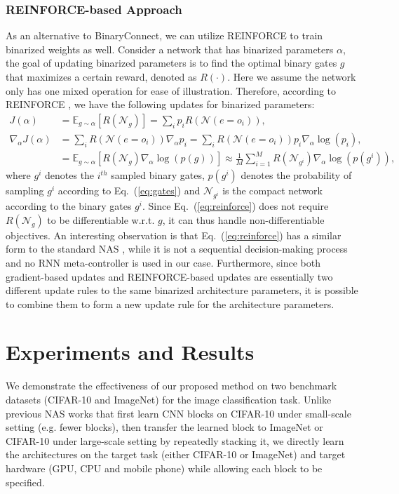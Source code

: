 \documentclass{article} \usepackage{iclr2019_conference,times}
\begin{document}
\subsubsection{REINFORCE-based Approach}\label{sec:reinforce_algo}
As an alternative to BinaryConnect, we can utilize REINFORCE to train binarized weights as well. Consider a network that has binarized parameters $\alpha$, the goal of updating binarized parameters is to find the optimal binary gates $g$ that maximizes a certain reward, denoted as $R(\cdot)$. Here we assume the network only has one mixed operation for ease of illustration. Therefore, according to REINFORCE \citep{williams1992simple}, we have the following updates for binarized parameters:
\begin{align}
\label{eq:reinforce}
    J(\alpha) &= \mathbb{E}_{g \sim \alpha}[R(\mathcal{N}_g)] 
               = \sum_i p_i R(\mathcal{N}(e = o_i)), \nonumber \\
    \nabla_\alpha J(\alpha) &= \sum_i R(\mathcal{N}(e = o_i)) \nabla_\alpha p_i = \sum_i R(\mathcal{N}(e = o_i)) p_i \nabla_\alpha \log(p_i), \nonumber \\
    &= \mathbb{E}_{g \sim \alpha} [R(\mathcal{N}_g) \nabla_\alpha \log(p(g))]
    \approx \frac{1}{M} \sum_{i=1}^M R(\mathcal{N}_{g^i}) \nabla_\alpha \log(p(g^i)),
\end{align}
where $g^i$ denotes the $i^{th}$ sampled binary gates, $p(g^i)$ denotes the probability of sampling $g^i$ according to Eq.~(\ref{eq:gates}) and $\mathcal{N}_{g^i}$ is the compact network according to the binary gates $g^i$. Since Eq.~(\ref{eq:reinforce}) does not require $R(\mathcal{N}_g)$ to be differentiable w.r.t. $g$, it can thus handle non-differentiable objectives. An interesting observation is that Eq.~(\ref{eq:reinforce}) has a similar form to the standard NAS \citep{zoph2016neural}, while it is not a sequential decision-making process and no RNN meta-controller is used in our case. Furthermore, since both gradient-based updates and REINFORCE-based updates are essentially two different update rules to the same binarized architecture parameters, it is possible to combine them to form a new update rule for the architecture parameters. 
 
\section{Experiments and Results}
We demonstrate the effectiveness of our proposed method on two benchmark datasets (CIFAR-10 and ImageNet) for the image classification task. Unlike previous NAS works \citep{zoph2017learning,liu2018darts} that first learn CNN blocks on CIFAR-10 under small-scale setting (e.g. fewer blocks), then transfer the learned block to ImageNet or CIFAR-10 under large-scale setting by repeatedly stacking it, we directly learn the architectures on the target task (either CIFAR-10 or ImageNet) and target hardware (GPU, CPU and mobile phone) while allowing each block to be specified. 
\end{document}
